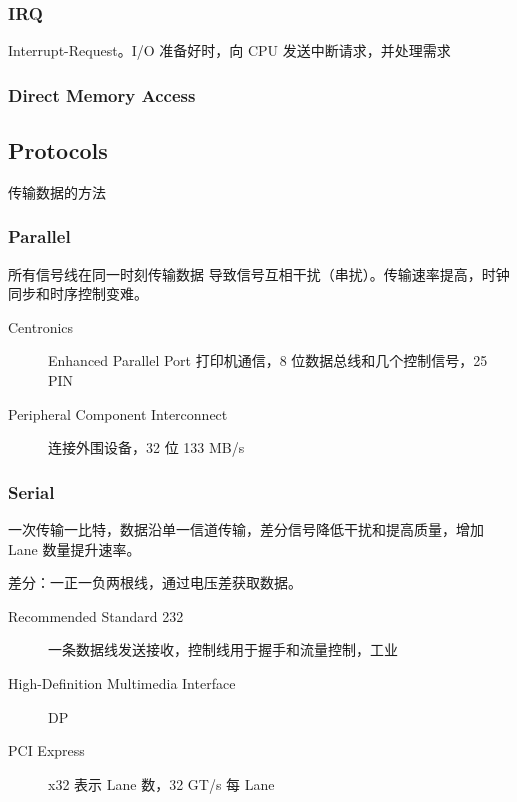 \documentclass[11pt,journal,compsoc]{IEEEtran}
\begin{document}
\subsubsection{IRQ}

Interrupt-Request。I/O 准备好时，向 CPU 发送中断请求，并处理需求


\subsubsection{Direct Memory Access}


\subsection{Protocols}

传输数据的方法


\subsubsection{Parallel}

所有信号线在同一时刻传输数据 导致信号互相干扰（串扰）。传输速率提高，时钟同步和时序控制变难。

\begin{description}
    \item[Centronics] Enhanced Parallel Port 打印机通信，8 位数据总线和几个控制信号，25 PIN

    \item[Peripheral Component Interconnect] 连接外围设备，32 位 133 MB/s
\end{description}


\subsubsection{Serial}

一次传输一比特，数据沿单一信道传输，差分信号降低干扰和提高质量，增加 Lane 数量提升速率。

差分：一正一负两根线，通过电压差获取数据。

\begin{description}
    \item[Recommended Standard 232] 一条数据线发送接收，控制线用于握手和流量控制，工业

    \item[High-Definition Multimedia Interface] DP

    \item[PCI Express] x32 表示 Lane 数，32 GT/s 每 Lane
\end{description}
\end{document}
